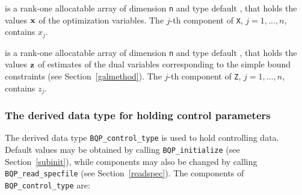 \documentclass{galahad}
\newcommand{\packagename}{BQP}
\begin{document}
\begin{description}
 is a rank-one allocatable array of dimension {\tt n} and type 
default \realdp, 
that holds the values ${\mathbf{x}}$ of the optimization variables.
The $j$-th component of {\tt X}, $j = 1,  \ldots , n$, contains $x_{j}$.  

 is a rank-one allocatable array of dimension {\tt n} and type default 
\realdp, that holds
the values ${\mathbf{z}}$ of estimates  of the dual variables 
corresponding to the simple bound constraints (see Section~\ref{galmethod}).
The $j$-th component of {\tt Z}, $j = 1,  \ldots ,  n$, contains $z_{j}$.  

\end{description}


\subsubsection{The derived data type for holding control 
 parameters}\label{typecontrol}
The derived data type 
{\tt \packagename\_control\_type} 
is used to hold controlling data. Default values may be obtained by calling 
{\tt \packagename\_initialize}
(see Section~\ref{subinit}),
while components may also be changed by calling 
{\tt \packagename\_read\-\_specfile}
(see Section~\ref{readspec}). 
The components of 
{\tt \packagename\_control\_type} 
are:
\end{document}

